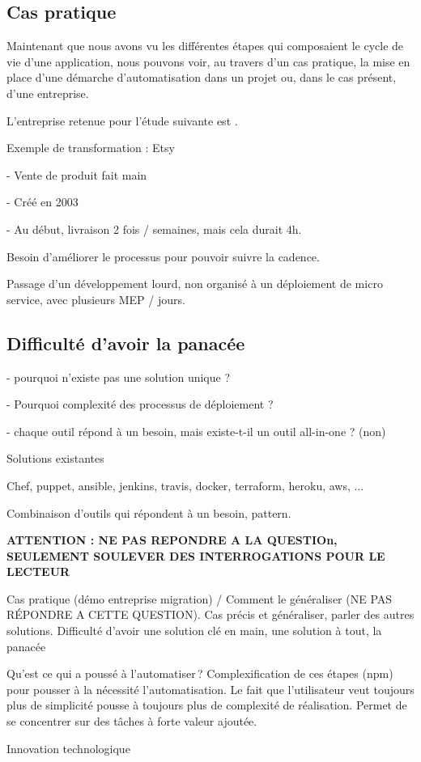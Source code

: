 \subsection{Cas pratique}

Maintenant que nous avons vu les différentes étapes qui composaient le cycle de vie d'une application, nous pouvons voir, au travers d'un cas pratique, la mise en place d'une démarche d'automatisation dans un projet ou, dans le cas présent, d'une entreprise.

L'entreprise retenue pour l'étude suivante est \etsy.


Exemple de transformation : Etsy

- Vente de produit fait main

- Créé en 2003

- Au début, livraison 2 fois / semaines, mais cela durait 4h.

Besoin d'améliorer le processus pour pouvoir suivre la cadence.

Passage d'un développement lourd, non organisé à un déploiement de micro service, avec plusieurs MEP / jours.

\subsection{Difficulté d'avoir la panacée}


- pourquoi n'existe pas une solution unique ? 

- Pourquoi complexité des processus de déploiement ? 

- chaque outil répond à un besoin, mais existe-t-il un outil all-in-one ? (non)

Solutions existantes

Chef, puppet, ansible, jenkins, travis, docker, terraform, heroku, aws, ...

Combinaison d'outils qui répondent à un besoin, pattern.


\textbf{ATTENTION : NE PAS REPONDRE A LA QUESTIOn, SEULEMENT SOULEVER DES INTERROGATIONS POUR LE LECTEUR}

Cas pratique (démo entreprise migration) / Comment le généraliser (NE PAS RÉPONDRE A CETTE QUESTION). Cas précis et généraliser, parler des autres solutions. Difficulté d'avoir une solution clé en main, une solution à tout, la panacée

Qu'est ce qui a poussé à l'automatiser ? Complexification de ces étapes (npm) pour pousser à la nécessité l'automatisation. Le fait que l'utilisateur veut toujours plus de simplicité pousse à toujours plus de complexité de réalisation. Permet de se concentrer sur des tâches à forte valeur ajoutée.

Innovation technologique 